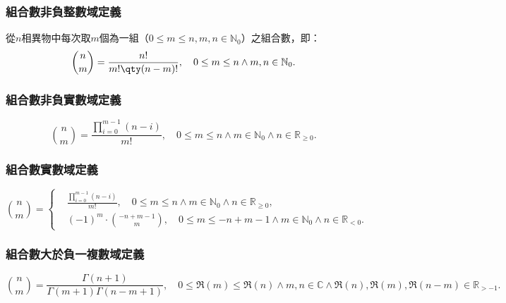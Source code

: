\documentclass[a4paper,12pt]{report}
\begin{document}
\subsubsection{組合數非負整數域定義}
從$n$相異物中每次取$m$個為一組（$0 \leq m \leq n, m,n \in \mathbb{N}_0$）之組合數，即：
\[\binom{n}{m} = \frac{n!}{m!\qty(n-m)!}, \quad 0 \leq m \leq n\land m,n \in \mathbb{N}_0.\]
\subsubsection{組合數非負實數域定義}
\[\binom{n}{m} = \frac{\prod_{i=0}^{m-1} \left(n-i\right)}{m!}, \quad 0 \leq m \leq n\land m \in \mathbb{N}_0\land n \in \mathbb{R}_{\geq 0}.\]
\subsubsection{組合數實數域定義}
\[\binom{n}{m} = 
\begin{cases}
& \frac{\prod_{i=0}^{m-1} \left(n-i\right)}{m!}, \quad 0 \leq m \leq n\land m \in \mathbb{N}_0\land n \in \mathbb{R}_{\geq 0},\\
& (-1)^m \cdot \binom{-n+m-1}{m}, \quad 0 \leq m \leq -n+m-1\land m \in \mathbb{N}_0\land n \in \mathbb{R}_{<0}.
\end{cases}\]
\subsubsection{組合數大於負一複數域定義}
\[\binom{n}{m} = \frac{\Gamma(n+1)}{\Gamma(m+1)\Gamma(n-m+1)}, \quad 0 \leq \Re(m) \leq \Re(n)\land m,n\in\mathbb{C}\land \Re(n),\Re(m),\Re(n-m) \in \mathbb{R}_{>-1}.\]
\end{document}
